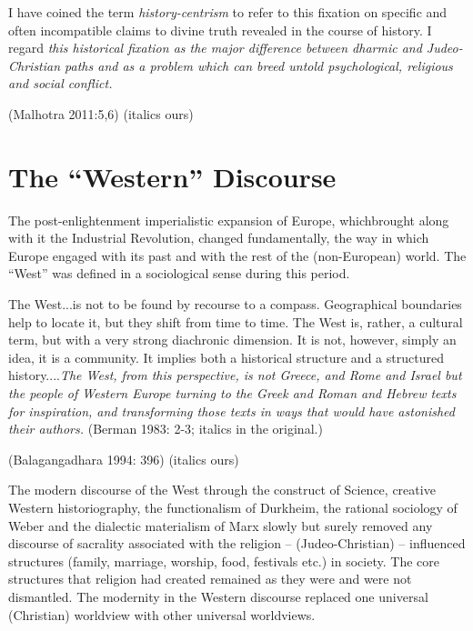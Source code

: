 \begin{myquote}
I have coined the term \textit{history-centrism} to refer to this fixation on specific and often incompatible claims to divine truth revealed in the course of history. I regard \textit{this historical fixation as the major difference between dharmic and Judeo-Christian paths and as a problem which can breed untold psychological, religious and social conflict.}
\end{myquote}

\hfill (Malhotra 2011:5,6) (italics ours)


\section*{The “Western” Discourse}

The post-enlightenment imperialistic expansion of Europe, which\break brought along with it the Industrial Revolution, changed fundamentally, the way in which Europe engaged with its past and with the rest of the (non-European) world. The “West” was defined in a sociological sense during this period.

\begin{myquote}
The West...is not to be found by recourse to a compass. Geographical boundaries help to locate it, but they shift from time to time. The West is, rather, a cultural term, but with a very strong diachronic dimension. It is not, however, simply an idea, it is a community. It implies both a historical structure and a structured history....\textit{The West, from this perspective, is not Greece, and Rome and Israel but the people of Western Europe turning to the Greek and Roman and Hebrew texts for inspiration, and transforming those texts in ways that would have astonished their authors.} (Berman 1983: 2-3; italics in the original.)
\end{myquote}

\hfill (Balagangadhara 1994: 396) (italics ours)

The modern discourse of the West through the construct of Science, creative Western historiography, the functionalism of Durkheim, the rational sociology of Weber and the dialectic materialism of Marx slowly but surely removed any discourse of sacrality associated with the religion – (Judeo-Christian) – influenced structures (family, marriage, worship, food, festivals etc.) in society. The core structures that religion had created remained as they were and were not dismantled. The modernity in the Western discourse replaced one universal (Christian) worldview with other universal worldviews.

